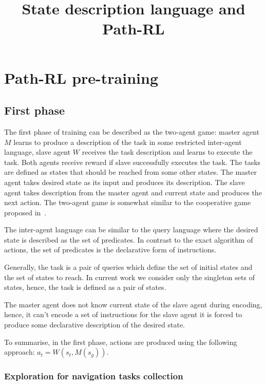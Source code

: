 \documentclass{article}
\title{State description language and Path-RL}
\author{}
\date{}
\begin{document}
\maketitle

\section{Path-RL pre-training}

\subsection{First phase}

The first phase of training can be described as the two-agent game: master agent $M$ learns to produce a description of the task in some restricted inter-agent language, slave agent $W$ receives the task description and learns to execute the task. Both agents receive reward if slave successfully executes the task. The tasks are defined as states that should be reached from some other states. The master agent takes desired state as its input and produces its description. The slave agent takes description from the master agent and current state and produces the next action. The two-agent game is somewhat similar to the cooperative game proposed in~\citep{Mordatch2018EmergenceOG}.

The inter-agent language can be similar to the query language where the desired state is described as the set of predicates. In contrast to the exact algorithm of actions, the set of predicates is the declarative form of instructions.

Generally, the task is a pair of queries which define the set of initial states and the set of states to reach. In current work we consider only the singleton sets of states, hence, the task is defined as a pair of states.

The master agent does not know current state of the slave agent during encoding, hence, it can't encode a set of instructions for the slave agent it is forced to produce some declarative description of the desired state.

To summarise, in the first phase, actions are produced using the following approach: $a_t = W(s_t, M(s_g))$.

\subsubsection{Exploration for navigation tasks collection}
\end{document}
